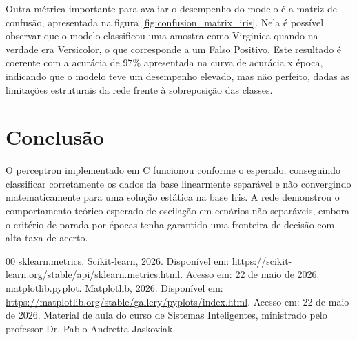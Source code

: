 \documentclass[conference]{IEEEtran}
\begin{document}
				Outra métrica importante para avaliar o desempenho do modelo é a matriz de confusão, apresentada na figura \ref{fig:confusion_matrix_iris}. Nela é possível observar que o modelo classificou uma amostra como Virginica quando na verdade era Versicolor, o que corresponde a um Falso Positivo. Este resultado é coerente com a acurácia de $97\%$ apresentada na curva de acurácia x época, indicando que o modelo teve um desempenho elevado, mas não perfeito, dadas as limitações estruturais da rede frente à sobreposição das classes.

	\section{Conclusão}

		O perceptron implementado em C funcionou conforme o esperado, conseguindo classificar corretamente os dados da base linearmente separável e não convergindo matematicamente para uma solução estática na base Iris. A rede demonstrou o comportamento teórico esperado de oscilação em cenários não separáveis, embora o critério de parada por épocas tenha garantido uma fronteira de decisão com alta taxa de acerto.

	\begin{thebibliography}{00}
		 sklearn.metrics. Scikit-learn, 2026. Disponível em: \url{https://scikit-learn.org/stable/api/sklearn.metrics.html}. Acesso em: 22 de maio de 2026.
		 matplotlib.pyplot. Matplotlib, 2026. Disponível em: \url{https://matplotlib.org/stable/gallery/pyplots/index.html}. Acesso em: 22 de maio de 2026.
		 Material de aula do curso de Sistemas Inteligentes, ministrado pelo professor Dr. Pablo Andretta Jaskoviak.
	\end{thebibliography}
\end{document}
